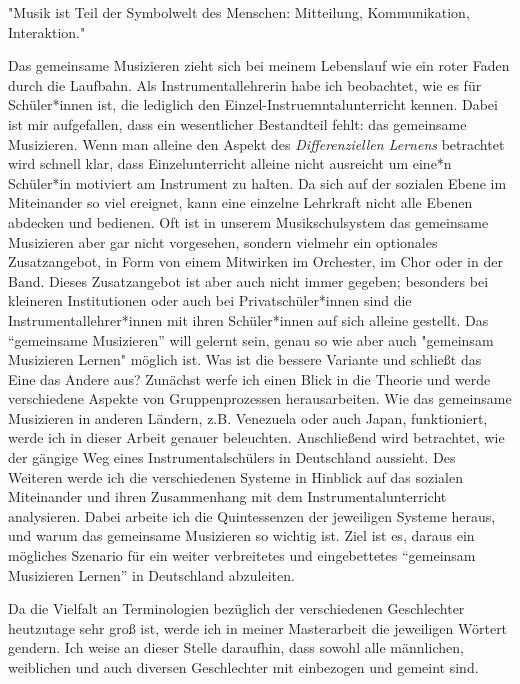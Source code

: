 
"Musik ist Teil der Symbolwelt des Menschen: Mitteilung, Kommunikation,
Interaktion." \autocite[91]{doerne:umfassend_musizieren}

Das gemeinsame Musizieren zieht sich bei meinem Lebenslauf wie ein roter Faden
durch die Laufbahn. Als Instrumentallehrerin habe ich beobachtet, wie es für
Schüler*innen ist, die lediglich den Einzel-Instruemntalunterricht kennen. Dabei ist
mir aufgefallen, dass ein wesentlicher Bestandteil fehlt: das gemeinsame
Musizieren. Wenn man alleine den Aspekt des \emph{Differenziellen Lernens} betrachtet
wird schnell klar, dass Einzelunterricht alleine nicht ausreicht um eine*n
Schüler*in motiviert am Instrument zu halten. Da sich auf der sozialen Ebene im
Miteinander so viel ereignet, kann eine einzelne Lehrkraft nicht alle Ebenen
abdecken und bedienen. Oft ist in unserem Musikschulsystem das gemeinsame
Musizieren aber gar nicht vorgesehen, sondern vielmehr ein optionales
Zusatzangebot, in Form von einem Mitwirken im Orchester, im Chor oder in der
Band. Dieses Zusatzangebot ist aber auch nicht immer gegeben; besonders bei
kleineren Institutionen oder auch bei Privatschüler*innen sind die
Instrumentallehrer*innen mit ihren Schüler*innen auf sich alleine gestellt. Das \enquote{gemeinsame
Musizieren} will gelernt sein, genau so wie aber auch "gemeinsam Musizieren
Lernen" möglich ist. Was ist die bessere Variante und schließt das Eine das
Andere aus? Zunächst werfe ich einen Blick in die Theorie und werde
verschiedene Aspekte von Gruppenprozessen herausarbeiten.
Wie das gemeinsame Musizieren in anderen Ländern, z.B. Venezuela oder auch Japan,
funktioniert, werde ich in dieser Arbeit genauer beleuchten. Anschließend wird
betrachtet, wie der gängige Weg eines Instrumentalschülers in Deutschland
aussieht. Des Weiteren werde ich die verschiedenen Systeme in Hinblick auf das
sozialen Miteinander und ihren Zusammenhang mit dem Instrumentalunterricht
analysieren. Dabei arbeite ich die Quintessenzen der jeweiligen Systeme heraus,
und warum das gemeinsame Musizieren so wichtig ist. Ziel ist es, daraus ein
mögliches Szenario für ein weiter verbreitetes und eingebettetes \enquote{gemeinsam
Musizieren Lernen} in Deutschland abzuleiten.


Da die Vielfalt an Terminologien bezüglich der verschiedenen Geschlechter
heutzutage sehr groß ist, werde ich in meiner Masterarbeit
die jeweiligen Wörtert gendern. Ich weise an dieser Stelle
daraufhin, dass sowohl alle männlichen, weiblichen und auch diversen
Geschlechter mit einbezogen und gemeint sind. 

